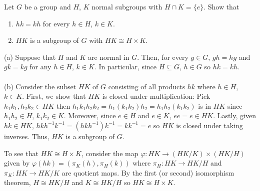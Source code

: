 \begin{problem}
  Let \(G\) be a group and \(H\), \(K\) normal subgroups with
  \(H\cap K=\{e\}\). Show that
  \begin{enumerate}[label=(\alph*),noitemsep]
  \item \(hk=kh\) for every \(h\in H\), \(k\in K\).
  \item \(HK\) is a subgroup of \(G\) with \(HK\cong H\times K\).
  \end{enumerate}
\end{problem}
\begin{solution}
  (a) Suppose that \(H\) and \(K\) are normal in \(G\). Then, for every
  \(g\in G\), \(gh=hg\) and \(gk=kg\) for any \(h\in H\), \(k\in K\). In
  particular, since \(H\subseteq G\), \(h\in G\) so \(hk=kh\).
  \\\\
  (b) Consider the subset \(HK\) of \(G\) consisting of all products \(hk\)
  where \(h\in H\), \(k\in K\). First, we show that \(HK\) is closed under
  multiplication: Pick \(h_1k_1,h_2k_2\in HK\) then
  \(h_1k_1h_2k_2=h_1(k_1k_2)h_2=h_1h_2(k_1k_2)\) is in \(HK\) since
  \(h_1h_2\in H\), \(k_1k_2\in K\). Moreover, since \(e\in H\) and
  \(e\in K\), \(ee=e\in HK\). Lastly, given \(hk\in HK\),
  \(hkh^{-1}k^{-1}=(hkh^{-1})k^{-1}=kk^{-1}=e\) so \(HK\) is closed under
  taking inverses. Thus, \(HK\) is a subgroup of \(G\).

  To see that \(HK\cong H\times K\), consider the map
  \(\varphi\colon HK\to (HK/K)\times(HK/H)\) given by
  \(\varphi(hk)=(\pi_K(h),\pi_H(k))\) where \(\pi_H\colon HK\to HK/H\) and
  \(\pi_K\colon HK\to HK/K\) are quotient maps. By the first (or second)
  isomorphism theorem, \(H\cong HK/H\) and \(K\cong HK/H\) so
  \(HK\cong H\times K\).
\end{solution}

